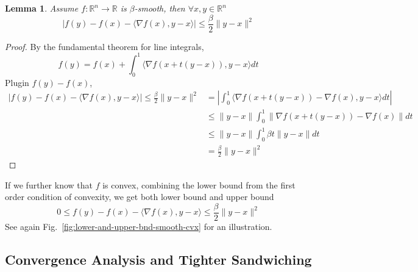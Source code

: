 \documentclass{scrartcl}
\newtheorem{lemma}{Lemma}
\newcommand{\RR}{\mathbb{R}}
\begin{document}
\begin{lemma}
  Assume $f:\RR^n\rightarrow \RR$ is $\beta$-smooth, then $\forall x,y\in\RR^n$
  \[
  |f(y)-f(x)- \langle \nabla f(x), y-x\rangle | \leq \frac{\beta}{2}\|y-x\|^2
  \]
\end{lemma}
\begin{proof}
By the fundamental theorem for line integrals,
\[
  f(y) = f(x) + \int_{0}^1 \langle \nabla f(x + t(y-x)), y-x\rangle dt
\]
Plugin $f(y)-f(x)$,
\[
  \begin{aligned}
  |f(y)-f(x)- \langle \nabla f(x), y-x\rangle | \leq \frac{\beta}{2}\|y-x\|^2
  &= \left| \int_0^1 \langle \nabla f(x+t(y-x))-\nabla f(x), y-x\rangle dt \right| \\
  &\leq \|y-x\|\int_0^1 \|\nabla f(x+t(y-x))-\nabla f(x)\| dt \\
  &\leq \|y-x\|\int_0^1 \beta t\|y-x\|dt \\
  &=\frac{\beta}{2}\|y-x\|^2
  \end{aligned}
\]
\end{proof}

If we further know that $f$ is convex, combining the lower bound from the first order condition of
convexity, we get both lower bound and upper bound
\begin{equation}
  0 \leq f(y) - f(x) - \langle \nabla f(x), y-x\rangle \leq \frac{\beta}{2}\|y-x\|^2
  \label{eq:beta-smooth-lower-upper-bnd-0}
\end{equation}
See again Fig.~\ref{fig:lower-and-upper-bnd-smooth-cvx} for an illustration.

\subsection{Convergence Analysis and Tighter Sandwiching}
\end{document}
